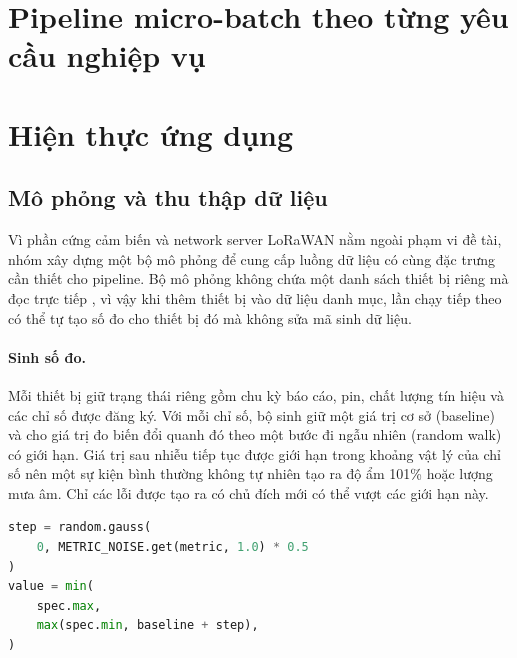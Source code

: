 \section{Pipeline micro-batch theo từng yêu cầu nghiệp vụ}
\label{sec:4-pipeline}












\section{Hiện thực ứng dụng}
\label{sec:4-application}

\subsection{Mô phỏng và thu thập dữ liệu}
\label{sec:4-simulation-ingest}

Vì phần cứng cảm biến và network server LoRaWAN nằm ngoài phạm vi đề tài, nhóm xây dựng một bộ mô phỏng để cung cấp luồng dữ liệu có cùng đặc trưng cần thiết cho pipeline. Bộ mô phỏng không chứa một danh sách thiết bị riêng mà đọc trực tiếp , vì vậy khi thêm thiết bị vào dữ liệu danh mục, lần chạy tiếp theo có thể tự tạo số đo cho thiết bị đó mà không sửa mã sinh dữ liệu.

\paragraph{Sinh số đo.}
Mỗi thiết bị giữ trạng thái riêng gồm chu kỳ báo cáo, pin, chất lượng tín hiệu và các chỉ số được đăng ký. Với mỗi chỉ số, bộ sinh giữ một giá trị cơ sở (baseline) và cho giá trị đo biến đổi quanh đó theo một bước đi ngẫu nhiên (random walk) có giới hạn. Giá trị sau nhiễu tiếp tục được giới hạn trong khoảng vật lý của chỉ số nên một sự kiện bình thường không tự nhiên tạo ra độ ẩm 101\% hoặc lượng mưa âm. Chỉ các lỗi được tạo ra có chủ đích mới có thể vượt các giới hạn này.

\begin{lstlisting}[language=Python, caption={Sinh giá trị bằng random walk có giới hạn (rút gọn)}, label={lst:4-simulator-walk}]
step = random.gauss(
    0, METRIC_NOISE.get(metric, 1.0) * 0.5
)
value = min(
    spec.max,
    max(spec.min, baseline + step),
)
\end{lstlisting}

